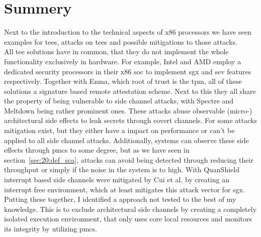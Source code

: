 \section{Summery}
Next to the introduction to the technical aspects of x86 processors we have seen
examples for \glspl{tee}, attacks on \glspl{tee} and possible mitigations to
those attacks. \\

All \gls{tee} solutions have in common, that they do not implement the whole
functionality exclusively in hardware. For example, Intel and AMD employ a
dedicated security processors in their x86 \gls{soc} to implement \gls{sgx} and
\gls{sev} features respectively. Together with Enma, which root of trust is the
\gls{tpm}, all of these solutions a signature based remote attestation scheme.
Next to this they all share the property of being vulnerable to side channel
attacks, with Spectre and Meltdown being rather prominent ones. These attacks
abuse observable (micro-) architectural side effects to leak secrets through
covert channels. For some attacks mitigation exist, but they either have a
impact on performance or can't be applied to all side channel attacks.
Additionally, systems can observe these side effects through \glspl{pmc} to some
degree, but as we have seen in section~\ref{sec:20:def_sca}, attacks can avoid
being detected through reducing their throughput or simply if the noise in the
system is to high. With QuanShield interrupt based side channels were mitigated
by Cui et al. by creating an interrupt free environment, which at least
mitigates this attack vector for \gls{sgx}.\\

Putting these together, I identified a approach not tested to the best of my
knowledge. This is to exclude architectural side channels by creating a
completely isolated execution environment, that only uses core local resources
and monitors its integrity by utilizing \glspl{pmc}.
